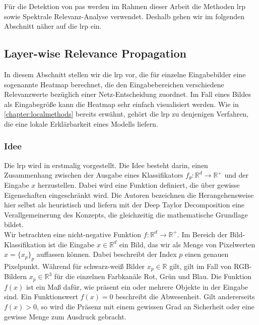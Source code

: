 \documentclass[twoside, 12pt,a4paper]{book}
\numberwithin{equation}{section}
\begin{document}
	\noindent Für die Detektion von \acp{pa} werden im Rahmen dieser Arbeit die Methoden \ac{lrp} sowie Spektrale Relevanz-Analyse verwendet. Deshalb gehen wir im folgenden Abschnitt näher auf die \ac{lrp} ein.
	
	\subsection{Layer-wise Relevance Propagation} \label{chapter_lrp}
	
	
	
	In diesem Abschnitt stellen wir die \acl{lrp} vor, die für einzelne Eingabebilder eine sogenannte Heatmap berechnet, die den Eingabebereichen verschiedene Relevanzwerte bezüglich einer Netz-Entscheidung zuordnet. Im Fall eines Bildes als Eingabegröße kann die Heatmap sehr einfach visualisiert werden. Wie  in \autoref{chapter:localmethods} bereits erwähnt, gehört die \ac{lrp} zu denjenigen Verfahren, die eine lokale Erklärbarkeit eines Modells liefern.
	
	
	\subsubsection{Idee}
	Die \ac{lrp} wird in \cite{LRP_first_paper} erstmalig vorgestellt. Die Idee besteht darin, einen Zusammenhang zwischen der Ausgabe eines Klassifikators ${f_{\theta}: \mathbb{R}^d\to \mathbb{R^{+}}}$ und der Eingabe $x$ herzustellen. Dabei wird eine Funktion definiert, die über gewisse Eigenschaften eingeschränkt wird. Die Autoren bezeichnen die Herangehensweise hier selbst als heuristisch und liefern mit der Deep Taylor Decomposition \cite{dtd} eine Verallgemeinerung des Konzepts, die gleichzeitig die mathematische Grundlage bildet.\\
	
	\noindent Wir betrachten eine nicht-negative Funktion $f: \mathbb{R}^d \to \mathbb{R}^{+}$. Im Bereich der Bild-Klassifikation ist die Eingabe $x \in \mathbb{R}^d$ ein Bild, das wir als Menge von Pixelwerten $x=\lbrace x_p \rbrace_p$ auffassen können. Dabei beschreibt der Index $p$ einen genauen Pixelpunkt. Während für schwarz-weiß Bilder $x_p \in \mathbb{R}$ gilt, gilt im Fall von RGB-Bildern $x_p \in \mathbb{R}^3$ für die einzelnen Farbkanäle Rot, Grün und Blau. Die Funktion $f(x)$ ist ein Maß dafür, wie präsent ein oder mehrere Objekte in der Eingabe sind. Ein Funktionswert $f(x)=0$ beschreibt die Abwesenheit. Gilt andererseits $f(x) >0$, so wird die Präsenz mit einem gewissen Grad an Sicherheit oder eine gewisse Menge zum Ausdruck gebracht.\\
	
\end{document}
